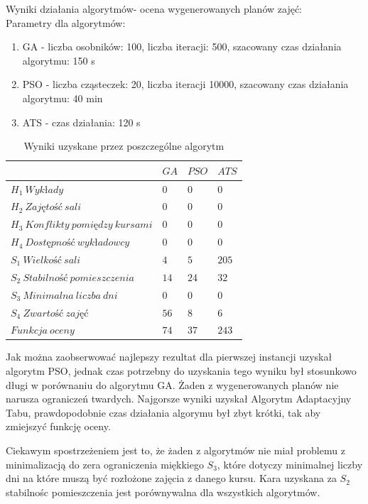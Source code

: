 \par Wyniki działania algorytmów- ocena wygenerowanych planów zajęć: \\
Parametry dla algorytmów:
\begin{enumerate}
\item GA - liczba osobników: 100, liczba iteracji: 500, szacowany czas działania algorytmu: 150 s
\item PSO - liczba cząsteczek: 20, liczba iteracji 10000, szacowany czas działania algorytmu: 40 min
\item ATS - czas działania: 120 s
\end{enumerate}
\begin{table}[H]
\begin{center}

\begin{tabular}{ |l|l|l|l| }
\hline
 & $GA$ & $PSO$ & $ATS$\\
\hline
${H}_{1}\ Wykłady$ & $0$ & $0$ & $0$\\
\hline
$H_{2}\ Zajętość\ sali$ & $0$ & $0$ & $0$\\
\hline
$H_{3}\ Konflikty\ pomiędzy\ kursami$ & $0$ & $0$ & $0$ \\
\hline
$H_{4}\ Dostępność\ wykładowcy$ & $0$ & $0$ & $0$ \\
\hline
$S_{1}\ Wielkość\ sali$ & $4$ & $5$ & $205$ \\
\hline
$S_{2}\ Stabilność\ pomieszczenia$ & $14$ & $24$ & $32$ \\
\hline
$S_{3}\ Minimalna\ liczba\ dni$ & $0$ & $0$ & $0$ \\
\hline
$S_{4}\ Zwartość\ zajęć$ & $56$ & $8$ & $6$ \\
\hline
$Funkcja\ oceny$ & $74$ & $37$ & $243$ \\
\hline
\end{tabular}
\end{center}
\caption {Wyniki uzyskane przez poszczególne algorytm}
\end{table}
\par Jak można zaobserwować najlepszy rezultat dla pierwszej instancji uzyskał algorytm PSO, jednak czas potrzebny do uzyskania tego wyniku był stosunkowo długi w porównaniu do algorytmu GA. Żaden z wygenerowanych planów nie narusza ograniczeń twardych. Najgorsze wyniki uzyskał Algorytm Adaptacyjny Tabu, prawdopodobnie czas działania algorymu był zbyt krótki, tak aby zmiejszyć funkcję oceny.
\par Ciekawym spostrzeżeniem jest to, że żaden z algorytmów nie miał problemu z minimalizacją do zera ograniczenia miękkiego $S_{3}$, które dotyczy minimalnej liczby dni na które muszą być rozłożone zajęcia z danego kursu. Kara uzyskana za $S_{2}$ stabilnośc pomieszczenia jest porównywalna dla wszystkich algorytmów.
